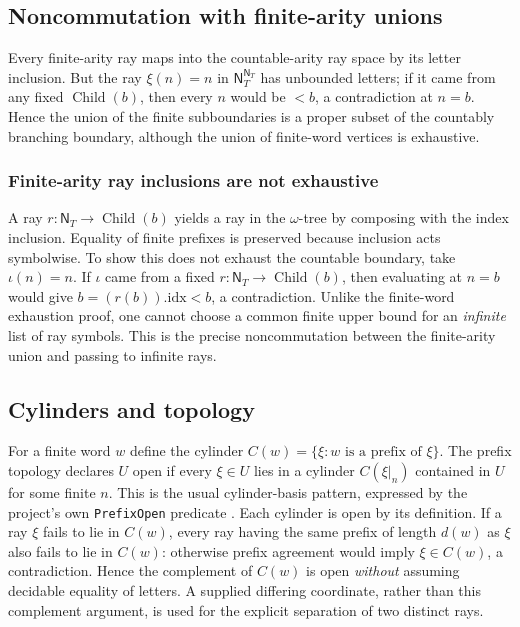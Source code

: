 \documentclass[11pt,reqno]{amsart}
\theoremstyle{definition}\newtheorem{definition}[theorem]{Definition}
\theoremstyle{remark}\newtheorem{remark}[theorem]{Remark}
\newcommand{\N}{\mathsf N_T}\newcommand{\Z}{\mathsf Z_T}\newcommand{\Q}{\mathsf Q_T}\newcommand{\RR}{\mathsf R}
\newcommand{\Fin}{\operatorname{Child}}
\begin{document}
\subsection{Noncommutation with finite-arity unions}\label{main:sub-32}
Every finite-arity ray maps into the countable-arity ray space by its letter inclusion. But the ray $\xi(n)=n$ in $\N^{\N}$ has unbounded letters; if it came from any fixed $\Fin(b)$, then every $n$ would be $<b$, a contradiction at $n=b$. Hence the union of the finite subboundaries is a proper subset of the countably branching boundary, although the union of finite-word vertices is exhaustive.


\medskip
\subsubsection*{Finite-arity ray inclusions are not exhaustive}\label{supp:10-2}
A ray $r:\N\to\Fin(b)$ yields a ray in the $\omega$-tree by composing with the index inclusion. Equality of finite prefixes is preserved because inclusion acts symbolwise. To show this does not exhaust the countable boundary, take $\iota(n)=n$. If $\iota$ came from a fixed $r:\N\to\Fin(b)$, then evaluating at $n=b$ would give $b=(r(b)).\mathrm{idx}<b$, a contradiction. Unlike the finite-word exhaustion proof, one cannot choose a common finite upper bound for an \emph{infinite} list of ray symbols. This is the precise noncommutation between the finite-arity union and passing to infinite rays.
\medskip

\subsection{Cylinders and topology}\label{main:sub-33}
For a finite word $w$ define the cylinder $C(w)=\{\xi:w\text{ is a prefix of }\xi\}$. The prefix topology declares $U$ open if every $\xi\in U$ lies in a cylinder $C(\xi|_n)$ contained in $U$ for some finite $n$. This is the usual cylinder-basis pattern, expressed by the project's own \texttt{PrefixOpen} predicate \cite{kechris}. Each cylinder is open by its definition. If a ray $\xi$ fails to lie in $C(w)$, every ray having the same prefix of length $d(w)$ as $\xi$ also fails to lie in $C(w)$: otherwise prefix agreement would imply $\xi\in C(w)$, a contradiction. Hence the complement of $C(w)$ is open \emph{without} assuming decidable equality of letters. A supplied differing coordinate, rather than this complement argument, is used for the explicit separation of two distinct rays.
\end{document}
